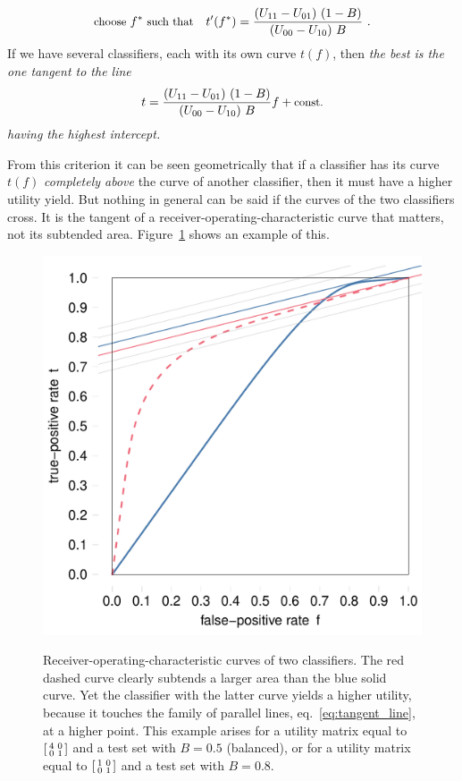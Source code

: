 \documentclass[\ifafour a4paper,12pt,\else a5paper,10pt,\fi%
onecolumn,oneside,article,%
british%
]{memoir}
\theoremstyle{remark}
\theoremstyle{innote}
\renewcommand*{\|}[1][]{\nonscript\:#1\vert\nonscript\:\mathopen{}}
\newcommand*{\eqn}{eq.}%
\begin{document}
\begin{equation}
  \label{eq:threshold_auc_maxutility_derivat}
  \text{\small choose } f^{*} \text{\small\ such that}\quad
t'(f^{*}) = \frac{(U_{11} - U_{01})\ (1-B)}{(U_{00} - U_{10})\  B} \ .
\end{equation}
If we have several classifiers, each with its own curve $t(f)$, then \emph{the best is the one tangent to the line
\begin{equation}
  \label{eq:tangent_line}
  t = \frac{(U_{11} - U_{01})\ (1-B)}{(U_{00} - U_{10})\  B} f + \textrm{\small const.}
\end{equation}
having the highest intercept.}

From this criterion it can be seen geometrically that if a classifier has its curve $t(f)$ \emph{completely above} the curve of another classifier, then it must have a higher utility yield. But nothing in general can be said if the curves of the two classifiers cross. It is the tangent of a receiver-operating-characteristic curve that matters, not its subtended area. Figure~\ref{fig:auc_example} shows an example of this.
\begin{figure}[t]
  \centering
    \includegraphics[width=0.66\linewidth]{auc_example.pdf}\\
    \caption{Receiver-operating-characteristic curves of two classifiers. The {\color{red}red dashed curve} clearly subtends a larger area than the {\color{blue}blue solid curve}. Yet the classifier with the latter curve yields a higher utility, because it touches the family of parallel lines, \eqn~\eqref{eq:tangent_line}, at a higher point. This example arises for a utility matrix equal to $\begin{bsmallmatrix} 4&0\\0&1 \end{bsmallmatrix}$ and a test set with $B=0.5$ (balanced), or for a utility matrix equal to $\begin{bsmallmatrix} 1&0\\0&1 \end{bsmallmatrix}$ and a test set with $B=0.8$.}
  \label{fig:auc_example}
\end{figure}
\end{document}
